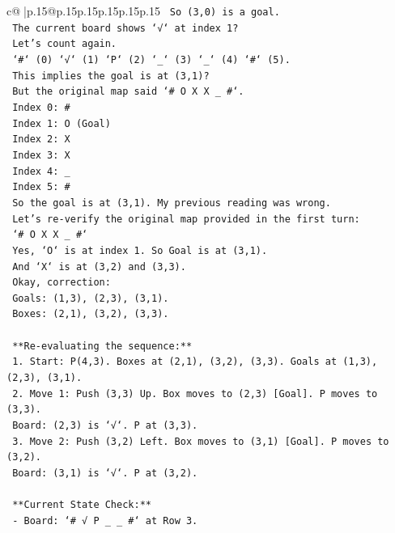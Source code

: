 \documentclass{article}
\begin{document}
{\begin{supertabular}{c@{$\;$}|p{.15\linewidth}@{}p{.15\linewidth}p{.15\linewidth}p{.15\linewidth}p{.15\linewidth}p{.15\linewidth}}
{{{\texttt{    So (3,0) is a goal.} \\
\texttt{    The current board shows `√` at index 1?} \\
\texttt{    Let's count again.} \\
\texttt{    `\#` (0) `√` (1) `P` (2) `\_` (3) `\_` (4) `\#` (5).} \\
\texttt{    This implies the goal is at (3,1)?} \\
\texttt{    But the original map said `\# O X X \_ \#`.} \\
\texttt{    Index 0: \#} \\
\texttt{    Index 1: O (Goal)} \\
\texttt{    Index 2: X} \\
\texttt{    Index 3: X} \\
\texttt{    Index 4: \_} \\
\texttt{    Index 5: \#} \\
\texttt{    So the goal is at (3,1). My previous reading was wrong.} \\
\texttt{    Let's re{-}verify the original map provided in the first turn:} \\
\texttt{    `\# O X X \_ \#`} \\
\texttt{    Yes, `O` is at index 1. So Goal is at (3,1).} \\
\texttt{    And `X` is at (3,2) and (3,3).} \\
\texttt{    Okay, correction:} \\
\texttt{    Goals: (1,3), (2,3), (3,1).} \\
\texttt{    Boxes: (2,1), (3,2), (3,3).} \\
\\ 
\texttt{    **Re{-}evaluating the sequence:**} \\
\texttt{    1. Start: P(4,3). Boxes at (2,1), (3,2), (3,3). Goals at (1,3), (2,3), (3,1).} \\
\texttt{    2. Move 1: Push (3,3) Up. Box moves to (2,3) {[}Goal{]}. P moves to (3,3).} \\
\texttt{       Board: (2,3) is `√`. P at (3,3).} \\
\texttt{    3. Move 2: Push (3,2) Left. Box moves to (3,1) {[}Goal{]}. P moves to (3,2).} \\
\texttt{       Board: (3,1) is `√`. P at (3,2).} \\
\\ 
\texttt{    **Current State Check:**} \\
\texttt{    {-} Board: `\# √ P \_ \_ \#` at Row 3.} \\
}}}
\end{supertabular}}
\end{document}
